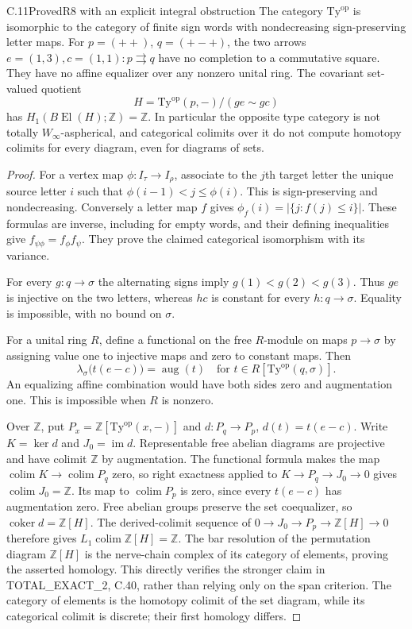 \begin{claim}{C.11}{Proved}{R8 with an explicit integral obstruction}
The category $\mathrm{Ty}^{\mathrm{op}}$ is isomorphic to the
category of finite sign words with nondecreasing sign-preserving
letter maps. For $p=(++)$, $q=(+-+)$, the two arrows
$e=(1,3),c=(1,1):p\rightrightarrows q$ have no completion to a
commutative square. They have no affine equalizer over any nonzero
unital ring. The covariant set-valued quotient
\[
 H=\mathrm{Ty}^{\mathrm{op}}(p,-)/(ge\sim gc)
\]
has $H_1(B\operatorname{El}(H);\mathbb Z)=\mathbb Z$.
In particular the opposite type category is not totally
$W_\infty$-aspherical, and categorical colimits over it do not
compute homotopy colimits for every diagram, even for diagrams of
sets.
\end{claim}
\begin{proof}
For a vertex map $\phi:I_\tau\to I_\rho$, associate to the
$j$th target letter the unique source letter $i$ such that
$\phi(i-1)<j\leq\phi(i)$. This is sign-preserving and
nondecreasing. Conversely a letter map $f$ gives
$\phi_f(i)=|\{j:f(j)\leq i\}|$. These formulas are inverse,
including for empty words, and their defining inequalities give
$f_{\psi\phi}=f_\phi f_\psi$. They prove the claimed categorical
isomorphism with its variance.

For every $g:q\to\sigma$ the alternating signs imply
$g(1)<g(2)<g(3)$. Thus $ge$ is injective on the two letters,
whereas $hc$ is constant for every $h:q\to\sigma$. Equality is
impossible, with no bound on $\sigma$.

For a unital ring $R$, define a functional on the free $R$-module
on maps $p\to\sigma$ by assigning value one to injective maps
and zero to constant maps. Then
\[
 \lambda_\sigma\bigl(t(e-c)\bigr)=\operatorname{aug}(t)
 \quad\text{for }t\in R[\mathrm{Ty}^{\mathrm{op}}(q,\sigma)].
\]
An equalizing affine combination would have both sides zero and
augmentation one. This is impossible when $R$ is nonzero.

Over $\mathbb Z$, put $P_x=\mathbb Z[\mathrm{Ty}^{\mathrm{op}}(x,-)]$
and $d:P_q\to P_p$, $d(t)=t(e-c)$. Write $K=\ker d$ and
$J_0=\operatorname{im}d$. Representable free abelian diagrams are
projective and have colimit $\mathbb Z$ by augmentation.
The functional formula makes the map
$\operatorname{colim}K\to\operatorname{colim}P_q$ zero,
so right exactness applied to $K\to P_q\to J_0\to0$ gives
$\operatorname{colim}J_0=\mathbb Z$. Its map to
$\operatorname{colim}P_p$ is zero, since every $t(e-c)$ has
augmentation zero. Free abelian groups preserve the set coequalizer,
so $\operatorname{coker}d=\mathbb Z[H]$. The derived-colimit
sequence of $0\to J_0\to P_p\to\mathbb Z[H]\to0$ therefore
gives $L_1\operatorname{colim}\mathbb Z[H]=\mathbb Z$.
The bar resolution of the permutation diagram $\mathbb Z[H]$
is the nerve-chain complex of its category of elements, proving
the asserted homology. This directly verifies the stronger claim
in TOTAL\_EXACT\_2, C.40, rather than relying only on the span
criterion. The category of elements is the homotopy colimit of the
set diagram, while its categorical colimit is discrete; their first
homology differs.


\end{proof}
